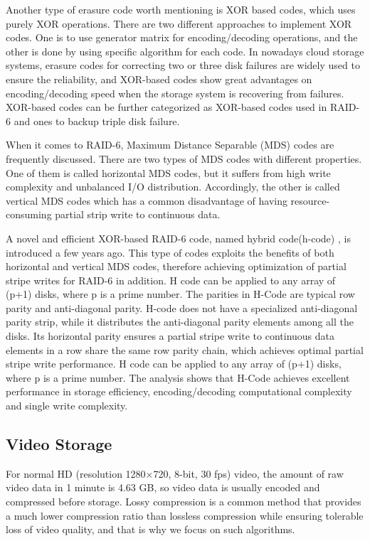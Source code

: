 \documentclass[sigconf]{acmart}
\begin{document}
Another type of erasure code worth mentioning is XOR based codes, which uses purely XOR operations. There are two different approaches to implement XOR codes. One is to use generator matrix\cite{plank2004practical} for encoding/decoding operations, and the other is done by using specific algorithm for each code\cite{huang2008star}. In nowadays cloud storage systems, erasure codes for correcting two or three disk failures are widely used to ensure the reliability, and XOR-based codes show great advantages on encoding/decoding speed when the storage system is recovering from failures. XOR-based codes can be further categorized as XOR-based codes used in RAID-6 and ones to backup triple disk failure.

When it comes to RAID-6, Maximum Distance Separable (MDS) \cite{jin2009p} \cite{cassuto2009cyclic} \cite{blaum1999lowest} \cite{corbett2004row} \cite{blaum1995evenodd} \cite{bloemer1995xor} codes are frequently discussed. There are two types of MDS codes with different properties. One of them is called horizontal MDS codes, but it suffers from high write complexity and unbalanced I/O distribution. Accordingly, the other is called vertical MDS codes which has a common disadvantage of having resource-consuming partial strip write to continuous data.

A novel and efficient XOR-based RAID-6 code, named hybrid code(h-code) \cite{inproceedings}, is introduced a few years ago. This type of codes exploits the benefits of both horizontal and vertical MDS codes, therefore achieving optimization of partial stripe writes for RAID-6 in addition. H code can be applied to any array of (p+1) disks, where p is a prime number. The parities in H-Code are typical row parity and anti-diagonal parity. H-code does not have a specialized anti-diagonal parity strip, while it distributes the anti-diagonal parity elements among all the disks. Its horizontal parity ensures a partial stripe write to continuous data elements in a row share the same row parity chain, which achieves optimal partial stripe write performance. H code can be applied to any array of (p+1) disks, where p is a prime number. The analysis shows that H-Code achieves excellent performance in storage efficiency, encoding/decoding computational complexity and single write complexity. 


\subsection{Video Storage}\label{video storage}
For normal HD (resolution 1280$\times$720, 8-bit, 30 fps) video, the amount of raw video data in 1 minute is 4.63 GB, so video data is usually encoded and compressed before storage. Lossy compression is a common method that provides a much lower compression ratio than lossless compression while ensuring tolerable loss of video quality, and that is why we focus on such algorithms.
\end{document}
